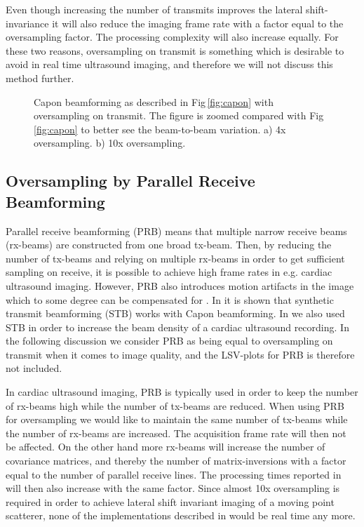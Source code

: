 \documentclass[journal]{IEEEtran}
\newcommand{\img}{img/}
\begin{document}
Even though increasing the number of transmits improves the lateral shift-invariance it will also reduce the imaging frame rate with a factor equal to the oversampling factor. The processing complexity will also increase equally. For these two reasons, oversampling on transmit is something which is desirable to avoid in real time ultrasound imaging, and therefore we will not discuss this method further.

\begin{figure}[!t]
\centerline{
\subfloat[]{
\texttt{[image: \\img capon\_L=32\_K=1\_d=001\_4x\_oversampling\_2\_zoomed.eps]}\label{fig:capon_oversampling_a}
}
\subfloat[]{
\texttt{[image: \\img capon\_L=32\_K=1\_d=001\_10x\_oversampling\_2\_zoomed.eps]}\label{fig:capon_oversampling_b}
}
}
\caption{Capon beamforming as described in Fig\,\ref{fig:capon} with oversampling on transmit. The figure is zoomed compared with Fig\,\ref{fig:capon} to better see the beam-to-beam variation. a) 4x oversampling. b) 10x oversampling.}
\label{fig:capon_oversampling}
\end{figure}

\subsection{Oversampling by Parallel Receive Beamforming}
Parallel receive beamforming (PRB) means that multiple narrow receive beams (rx-beams) are constructed from one broad tx-beam. Then, by reducing the number of tx-beams and relying on multiple rx-beams in order to get sufficient sampling on receive, it is possible to achieve high frame rates in e.g. cardiac ultrasound imaging. However, PRB also introduces motion artifacts in the image which to some degree can be compensated for \cite{Hergum2007, Denarie2011, Denarie2013}. In \cite{Rabinovich2013} it is shown that synthetic transmit beamforming (STB) \cite{Hergum2007} works with Capon beamforming. In \cite{Asen} we also used STB in order to increase the beam density of a cardiac ultrasound recording. In the following discussion we consider PRB as being equal to oversampling on transmit when it comes to image quality, and the LSV-plots for PRB is therefore not included.

In cardiac ultrasound imaging, PRB is typically used in order to keep the number of rx-beams high while the number of tx-beams are reduced. When using PRB for oversampling we would like to maintain the same number of tx-beams while the number of rx-beams are increased. The acquisition frame rate will then not be affected. On the other hand more rx-beams will increase the number of covariance matrices, and thereby the number of matrix-inversions with a factor equal to the number of parallel receive lines. The processing times reported in \cite{Asen} will then also increase with the same factor. Since almost 10x oversampling is required in order to achieve lateral shift invariant imaging of a moving point scatterer, none of the implementations described in \cite{Asen} would be real time any more.
\end{document}

